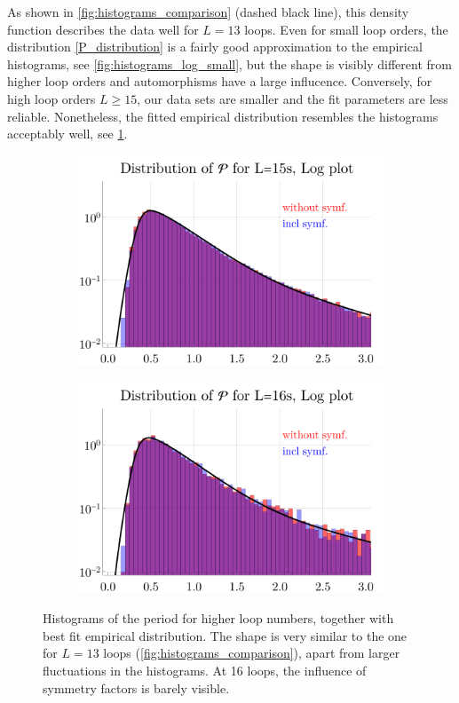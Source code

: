 \documentclass[11pt,a4paper]{article}
\renewcommand{\|}{\rule[-0.4ex]{0.2ex}{1.2em}}
\begin{document}
As shown in \cref{fig:histograms_comparison} (dashed black line), this density function describes the data well for $L=13$ loops. 
Even for small loop orders, the distribution \cref{P_distribution} is a fairly good approximation to the empirical histograms, see \cref{fig:histograms_log_small}, but the shape is visibly different from higher loop orders and automorphisms have a large influcence. 
Conversely, for high loop orders $L\geq 15$, our data sets are smaller and the fit parameters are less reliable. Nonetheless, the fitted empirical distribution resembles the histograms acceptably well, see \cref{fig:histograms_log_big}.


\begin{figure}[htbp]
	\centering
	\begin{subfigure}[b]{.48 \textwidth}
		\includegraphics[width=\linewidth]{distribution_P_15_log}
		\subcaption{}
	\end{subfigure}
	\begin{subfigure}[b]{.48 \textwidth}
		\includegraphics[width=\linewidth]{distribution_P_16_log}
		\subcaption{}
	\end{subfigure}
	
	\caption{Histograms of the period for higher loop numbers, together with best fit empirical distribution. The shape  is very similar to the one for $L=13$ loops (\cref{fig:histograms_comparison}), apart from larger fluctuations in the histograms. At 16 loops, the influence of symmetry factors is barely visible. }
	\label{fig:histograms_log_big}
\end{figure}
\end{document}
